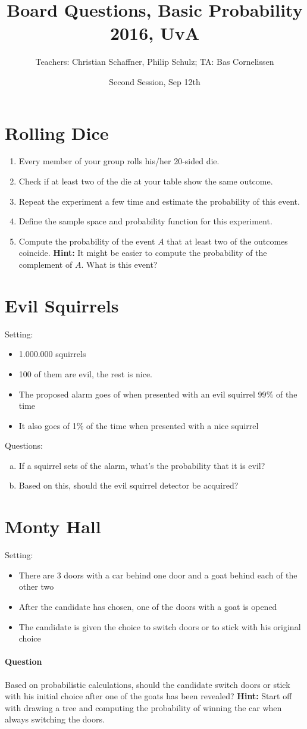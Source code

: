 \documentclass[11p,a4paper]{article}
\title{Board Questions, Basic Probability 2016, UvA}
\author{Teachers: Christian Schaffner, Philip Schulz; TA: Bas Cornelissen}
\date{Second Session, Sep 12th}
\begin{document}
\maketitle

\section{Rolling Dice}
\begin{enumerate}
\item Every member of your group rolls his/her 20-sided die.
\item Check if at least two of the die at your table show the same
  outcome.
\item Repeat the experiment a few time and estimate the probability of
  this event.
\item Define the sample space and probability function for this
  experiment.
\item Compute the probability of the event $A$ that at least two of
  the outcomes coincide. {\bf Hint:} It might be easier to compute the probability
  of the complement of $A$. What is this event?
\end{enumerate}

\section{Evil Squirrels}
Setting:
\begin{itemize}
\item 1.000.000 squirrels
\item 100 of them are evil, the rest is nice.
\item The proposed alarm goes of when presented with an evil squirrel 99$\%$ of the time
\item It also goes of 1$\%$ of the time when presented with a nice squirrel
\end{itemize}

Questions:
\begin{enumerate}[a)]
\item If a squirrel sets of the alarm, what's the probability that it is evil?
\item Based on this, should the evil squirrel detector be acquired?
\end{enumerate}

\section{Monty Hall}
Setting:
\begin{itemize}
\item There are 3 doors with a car behind one door and a goat behind each of the other two
\item After the candidate has chosen, one of the doors with a goat is opened
\item The candidate is given the choice to switch doors or to stick with his original choice
\end{itemize}
\paragraph{Question} Based on probabilistic calculations, should the
candidate switch doors or stick with his initial choice after one of
the goats has been revealed?
{\bf Hint:} Start off with drawing a tree and computing the
probability of winning the car when always switching the doors.
\end{document}
